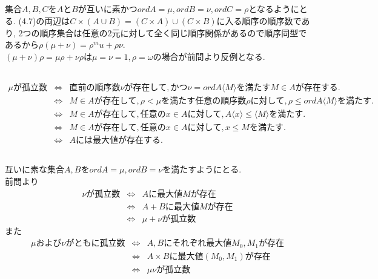 \documentclass{jsarticle}
\begin{document}
\subsection{} %
集合$A, B, C$を$A$と$B$が互いに素かつ$ord A = \mu, ord B = \nu, ord C = \rho$となるようにとる. (4.7)の両辺は$C \times (A \cup B) = (C \times A) \cup (C \times B)$に入る順序の順序数であり, 2つの順序集合は任意の2元に対して全く同じ順序関係があるので順序同型であるから$\rho(\mu + \nu) = \rho^mu + \rho\nu$.\\
$(\mu + \nu)\rho = \mu\rho + \nu\rho$は$\mu = \nu = 1, \rho = \omega$の場合が前問より反例となる.

\subsection{} %
\begin{eqnarray*}
	\mu が孤立数
	&\Leftrightarrow& 直前の順序数\nu が存在して, かつ\nu = ord A\langle M \rangle を満たすM \in Aが存在する.\\
	&\Leftrightarrow& M \in Aが存在して, \rho < \mu を満たす任意の順序数\rho に対して, \rho \le ord A\langle M \rangle を満たす.\\
	&\Leftrightarrow& M \in Aが存在して, 任意のx \in Aに対して, A\langle x \rangle \le \langle M \rangle を満たす.\\
	&\Leftrightarrow& M \in Aが存在して, 任意のx \in Aに対して, x \le Mを満たす.\\
	&\Leftrightarrow& Aには最大値が存在する.
\end{eqnarray*}

\subsection{} %
互いに素な集合$A, B$を$ord A = \mu, ord B = \nu$を満たすようにとる.\\
前問より
\begin{eqnarray*}
	\nu が孤立数
	&\Leftrightarrow& Aに最大値Mが存在\\
	&\Leftrightarrow& A + Bに最大値Mが存在\\
	&\Leftrightarrow& \mu + \nu が孤立数
\end{eqnarray*}
また
\begin{eqnarray*}
	\mu および \nu がともに孤立数
	&\Leftrightarrow& A, Bにそれぞれ最大値M_0, M_1が存在\\
	&\Leftrightarrow& A \times Bに最大値(M_0, M_1)が存在\\
	&\Leftrightarrow& \mu \nu が孤立数
\end{eqnarray*}
\end{document}
